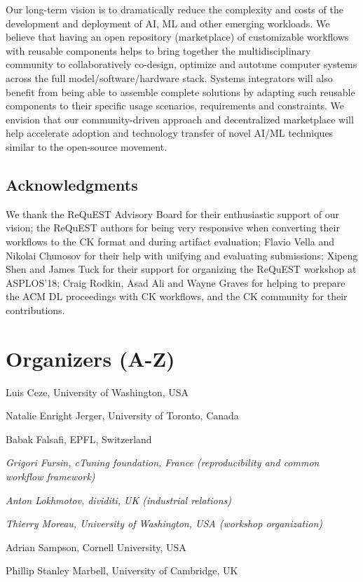 \documentclass[10pt,onecolumn]{article}
\newenvironment{packed_itemize}{
\begin{itemize}
  \setlength{\itemsep}{1pt}
  \setlength{\parskip}{0pt}
  \setlength{\parsep}{0pt}
}{\end{itemize}}
\begin{document}
Our long-term vision is to dramatically reduce the complexity
and costs of the development and deployment of AI, ML and
other emerging workloads. We believe that having an open
repository (marketplace) of customizable workflows with
reusable components helps to bring together the
multidisciplinary community to collaboratively co-design,
optimize and autotune computer systems across the full
model/software/hardware stack. Systems integrators will also
benefit from being able to assemble complete solutions
by adapting such reusable components to their specific usage
scenarios, requirements and constraints. We envision that our
community-driven approach and decentralized marketplace will
help accelerate adoption and technology transfer of novel
AI/ML techniques similar to the open-source movement.

\subsection*{Acknowledgments}

We thank the ReQuEST Advisory Board for their enthusiastic
support of our vision; the ReQuEST authors for being very
responsive when converting their workflows to the CK format
and during artifact evaluation; Flavio Vella and Nikolai
Chunosov for their help with unifying and evaluating
submissions; Xipeng Shen and James Tuck for their support for
organizing the ReQuEST workshop at ASPLOS'18; Craig Rodkin,
Asad Ali and Wayne Graves for helping to prepare the ACM DL
proceedings with CK workflows, and the CK community for their
contributions.


\section*{Organizers (A-Z)}

\begin{packed_itemize}

 \item Luis Ceze, University of Washington, USA
 \item Natalie Enright Jerger, University of Toronto, Canada
 \item Babak Falsafi, EPFL, Switzerland
 \item \textit{Grigori Fursin, cTuning foundation, France (reproducibility and common workflow framework)}
 \item \textit{Anton Lokhmotov, dividiti, UK (industrial relations)}
 \item \textit{Thierry Moreau, University of Washington, USA (workshop organization)}
 \item Adrian Sampson, Cornell University, USA
 \item Phillip Stanley Marbell, University of Cambridge, UK 

\end{packed_itemize}
\end{document}
